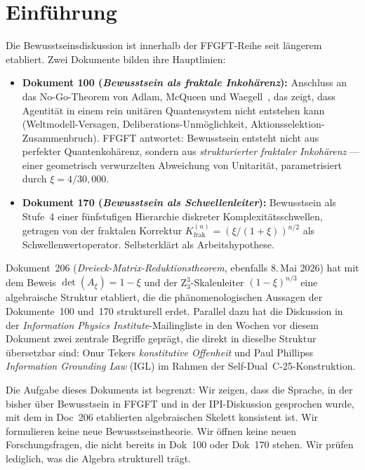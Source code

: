 
\section{Einführung}\label{sec:einleitung}

Die Bewusstseinsdiskussion ist innerhalb der FFGFT-Reihe seit längerem etabliert. Zwei Dokumente bilden ihre Hauptlinien:

\begin{itemize}
\item \textbf{Dokument 100 (\emph{Bewusstsein als fraktale Inkohärenz}):} Anschluss an das No-Go-Theorem von Adlam, McQueen und Waegell~\cite{Adlam2025}, das zeigt, dass Agentität in einem rein unitären Quantensystem nicht entstehen kann (Weltmodell-Versagen, Deliberations-Unmöglichkeit, Aktionsselektion-Zusammenbruch). FFGFT antwortet: Bewusstsein entsteht nicht aus perfekter Quantenkohärenz, sondern aus \emph{strukturierter fraktaler Inkohärenz} — einer geometrisch verwurzelten Abweichung von Unitarität, parametrisiert durch $\xi = 4/30{,}000$.
\item \textbf{Dokument 170 (\emph{Bewusstsein als Schwellenleiter}):} Bewusstsein als Stufe~4 einer fünfstufigen Hierarchie diskreter Komplexitätsschwellen, getragen von der fraktalen Korrektur $K_{\text{frak}}^{(n)} = (\xi/(1+\xi))^{n/2}$ als Schwellenwertoperator. Selbsterklärt als Arbeitshypothese.
\end{itemize}

Dokument~206 (\emph{Dreieck-Matrix-Reduktionstheorem}, ebenfalls 8.\,Mai 2026) hat mit dem Beweis $\det(A_\xi) = 1-\xi$ und der Z$_3^3$-Skalenleiter $(1-\xi)^{n/3}$ eine algebraische Struktur etabliert, die die phänomenologischen Aussagen der Dokumente~100 und~170 strukturell erdet. Parallel dazu hat die Diskussion in der \emph{Information Physics Institute}-Mailingliste in den Wochen vor diesem Dokument zwei zentrale Begriffe geprägt, die direkt in dieselbe Struktur übersetzbar sind: Onur Tekers \emph{konstitutive Offenheit} und Paul Phillipss \emph{Information Grounding Law} (IGL) im Rahmen der Self-Dual~C-25-Konstruktion.

\medskip

Die Aufgabe dieses Dokuments ist begrenzt: Wir zeigen, dass die Sprache, in der bisher über Bewusstsein in FFGFT und in der IPI-Diskussion gesprochen wurde, mit dem in Doc~206 etablierten algebraischen Skelett konsistent ist. Wir formulieren keine neue Bewusstseinstheorie. Wir öffnen keine neuen Forschungsfragen, die nicht bereits in Dok~100 oder Dok~170 stehen. Wir prüfen lediglich, was die Algebra strukturell trägt.

